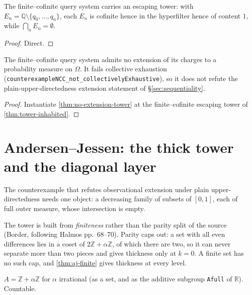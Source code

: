 \begin{theorem}
\label{thm:tower-inhabited}
\leanok
{}
The finite--cofinite query system carries an escaping tower: with
$E_n = \mathbb{Q} \setminus \{q_0,\dots,q_n\}$, each $E_n$ is cofinite hence in
the hyperfilter hence of content $1$, while $\bigcap_n E_n = \emptyset$.
\end{theorem}

\begin{proof}
\leanok
Direct.
\end{proof}

\begin{corollary}
\label{cor:cex-no-extension}
\leanok
{}
The finite--cofinite query system admits no extension of its charges to a
probability measure on $\Omega$. It fails collective exhaustion
(\texttt{counterexampleNCC\_not\_collectivelyExhaustive}), so it does not
refute the plain-upper-directedness extension statement of
\S\ref{sec:sequentiality}.
\end{corollary}

\begin{proof}
\leanok
Instantiate \ref{thm:no-extension-tower} at the finite--cofinite escaping tower of \ref{thm:tower-inhabited}.
\end{proof}
\chapter{Andersen--Jessen: the thick tower and the diagonal layer}

The counterexample that refutes observational extension under plain
upper-directedness needs one object: a decreasing family of subsets of $[0,1]$,
each of full outer measure, whose intersection is empty.

The tower is built from \emph{finiteness} rather than the parity split of the
source (Border, following Halmos pp.~68--70). Parity caps out: a set with all
even differences lies in a coset of $2\mathbb{Z}+\alpha\mathbb{Z}$, of which
there are two, so it can never separate more than two pieces and gives
thickness only at $k = 0$. A finite set has no such cap, and
\ref{thm:aj-finite} gives thickness at every level.

\begin{definition}
\label{def:aj-A}
\leanok
$A = \mathbb{Z} + \alpha\mathbb{Z}$ for $\alpha$ irrational (as a set, and as
the additive subgroup \texttt{Afull} of $\mathbb{R}$). Countable.
\end{definition}

